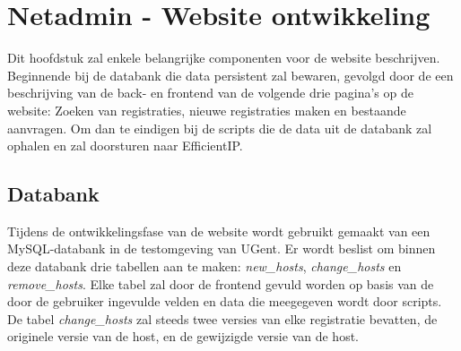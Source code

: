 
\chapter{Netadmin - Website ontwikkeling}%
\label{ch:netadmin-website-ontwikkeling}
Dit hoofdstuk zal enkele belangrijke componenten voor de website beschrijven. Beginnende bij de databank die data persistent zal bewaren, gevolgd door de een beschrijving van de back- en frontend van de volgende drie pagina's op de website: Zoeken van registraties, nieuwe registraties maken en bestaande aanvragen. Om dan te eindigen bij de scripts die de data uit de databank zal ophalen en zal doorsturen naar EfficientIP.

\section{Databank}
\label{databank}
Tijdens de ontwikkelingsfase van de website wordt gebruikt gemaakt van een MySQL-databank in de testomgeving van UGent. Er wordt beslist om binnen deze databank drie tabellen aan te maken: \textit{new\_hosts}, \textit{change\_hosts} en \textit{remove\_hosts}. Elke tabel zal door de frontend gevuld worden op basis van de door de gebruiker ingevulde velden en data die meegegeven wordt door scripts.
De tabel \textit{change\_hosts} zal steeds twee versies van elke registratie bevatten, de originele versie van de host, en de gewijzigde versie van de host.

